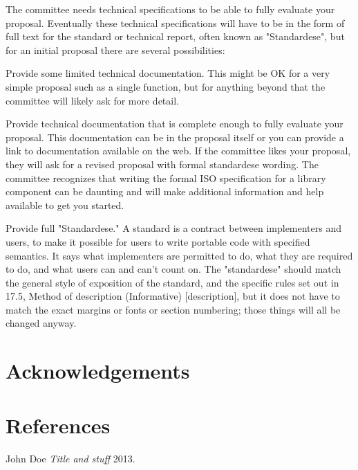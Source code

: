 \documentclass{isocpp_proposal}
\begin{document}
The committee needs technical specifications to be able to fully evaluate your proposal. Eventually these technical specifications will have to be in the form of full text for the standard or technical report, often known as "Standardese", but for an initial proposal there are several possibilities:

Provide some limited technical documentation. This might be OK for a very simple proposal such as a single function, but for anything beyond that the committee will likely ask for more detail. 
 
Provide technical documentation that is complete enough to fully evaluate your proposal. This documentation can be in the proposal itself or you can provide a link to documentation available on the web. If the committee likes your proposal, they will ask for a revised proposal with formal standardese wording. The committee recognizes that writing the formal ISO specification for a library component can be daunting and will make additional information and help available to get you started.
 
Provide full "Standardese." A standard is a contract between implementers and users, to make it possible for users to write portable code with specified semantics. It says what implementers are permitted to do, what they are required to do, and what users can and can't count on. The "standardese" should match the general style of exposition of the standard, and the specific rules set out in 17.5, Method of description (Informative) [description], but it does not have to match the exact margins or fonts or section numbering; those things will all be changed anyway.
\section{Acknowledgements}

\section{References}
\begin{thebibliography}{1} %
 John Doe {\em Title and stuff}  2013.
\end{thebibliography}
\end{document}
